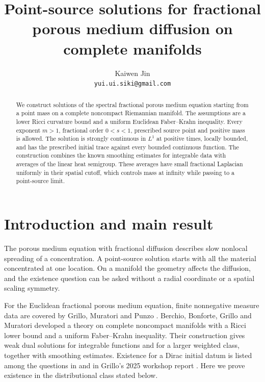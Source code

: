 \documentclass[11pt]{article}
\title{Point-source solutions for fractional porous medium diffusion on complete manifolds}
\author{Kaiwen Jin\\\small\texttt{yui.ui.siki@gmail.com}}
\date{}
\theoremstyle{remark}
\begin{document}
\maketitle
\begin{abstract}
We construct solutions of the spectral fractional porous medium equation
starting from a point mass on a complete noncompact Riemannian manifold.
The assumptions are a lower Ricci curvature bound and a uniform
Euclidean Faber--Krahn inequality. Every exponent $m>1$, fractional order
$0<s<1$, prescribed source point and positive mass is allowed. The solution
is strongly continuous in $L^1$ at positive times, locally bounded, and
has the prescribed initial trace against every bounded continuous function.
The construction combines the known smoothing estimates for integrable
data with averages of the linear heat semigroup. These averages have small
fractional Laplacian uniformly in their spatial cutoff, which controls mass
at infinity while passing to a point-source limit.
\end{abstract}

\section{Introduction and main result}

The porous medium equation with fractional diffusion describes slow
nonlocal spreading of a concentration. A point-source solution starts with
all the material concentrated at one location. On a manifold the geometry
affects the diffusion, and the existence question can be asked without a
radial coordinate or a spatial scaling symmetry.

For the Euclidean fractional porous medium equation, finite nonnegative
measure data are covered by Grillo, Muratori and Punzo
\cite[Theorem~3.2]{GMP}. Berchio, Bonforte, Grillo and Muratori
\cite{BBGM} developed a theory on complete noncompact manifolds with a
Ricci lower bound and a uniform Faber--Krahn inequality. Their construction
gives weak dual solutions for integrable functions and for a larger
weighted class, together with smoothing estimates. Existence for a Dirac
initial datum is listed among the questions in \cite[Section~7]{BBGM}
and in Grillo's 2025 workshop report \cite{OWR}. Here we prove existence
in the distributional class stated below.
\end{document}
